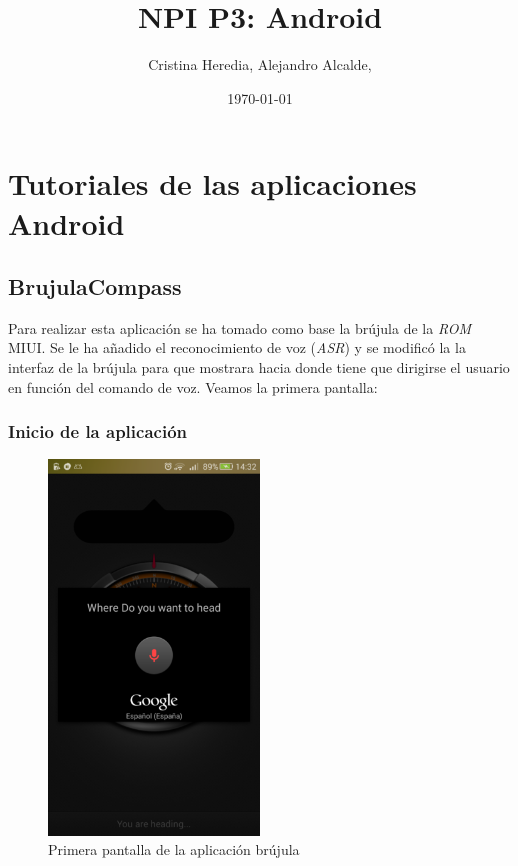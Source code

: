 \documentclass[	DIV=calc,%
							paper=a4,%
							fontsize=11pt]{scrartcl}	 					%
\title{NPI P3: Android}					%
\author{Cristina Heredia, Alejandro Alcalde,\;}											%
\date{\usefont{T1}{mdugm}{b}{it}\selectfont\today}																				%
\newcommand{\initial}[1]{%
     \lettrine[lines=3,lhang=0.3,nindent=0em]{
     				\color{DarkGoldenrod}
     				{\textsf{#1}}}{}}
\begin{document}
\maketitle
\tableofcontents
\thispagestyle{fancy} 			%
%

\section{Tutoriales de las aplicaciones
Android}\label{tutoriales-de-las-aplicaciones-android}

\subsection{BrujulaCompass}\label{brujulacompass}

Para realizar esta aplicación se ha tomado como base la brújula de la
\emph{ROM} MIUI. Se le ha añadido el reconocimiento de voz (\emph{ASR})
y se modificó la la interfaz de la brújula para que mostrara hacia donde
tiene que dirigirse el usuario en función del comando de voz. Veamos la
primera pantalla:

\subsubsection{Inicio de la
aplicación}\label{inicio-de-la-aplicaciuxf3n}

\begin{figure}[H]
\centering
\includegraphics[width=0.5\textwidth]{./img/inicioBrujula.png}
\caption{Primera pantalla de la aplicación brújula}
\end{figure}
\end{document}

